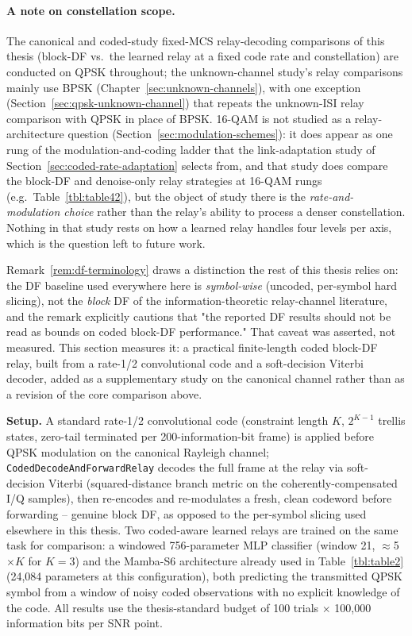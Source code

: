 \paragraph{A note on constellation scope.} The canonical and coded-study fixed-MCS relay-decoding comparisons of this thesis (block-DF vs.\ the learned relay at a fixed code rate and constellation) are conducted on QPSK throughout; the unknown-channel study's relay comparisons mainly use BPSK (Chapter~\ref{sec:unknown-channels}), with one exception (Section~\ref{sec:qpsk-unknown-channel}) that repeats the unknown-ISI relay comparison with QPSK in place of BPSK. 16-QAM is not studied as a relay-architecture question (Section~\ref{sec:modulation-schemes}): it does appear as one rung of the modulation-and-coding ladder that the link-adaptation study of Section~\ref{sec:coded-rate-adaptation} selects from, and that study does compare the block-DF and denoise-only relay strategies at 16-QAM rungs (e.g.\ Table~\ref{tbl:table42}), but the object of study there is the \emph{rate-and-modulation choice} rather than the relay's ability to process a denser constellation. Nothing in that study rests on how a learned relay handles four levels per axis, which is the question left to future work.

Remark~\ref{rem:df-terminology} draws a distinction the rest of this thesis relies on: the DF baseline used everywhere here is \emph{symbol-wise} (uncoded, per-symbol hard slicing), not the \emph{block} DF of the information-theoretic relay-channel literature, and the remark explicitly cautions that "the reported DF results should not be read as bounds on coded block-DF performance." That caveat was asserted, not measured. This section measures it: a practical finite-length coded block-DF relay, built from a rate-1/2 convolutional code and a soft-decision Viterbi decoder, added as a supplementary study on the canonical channel rather than as a revision of the core comparison above.

\textbf{Setup.} A standard rate-1/2 convolutional code (constraint length $K$, $2^{K-1}$ trellis states, zero-tail terminated per 200-information-bit frame) is applied before QPSK modulation on the canonical Rayleigh channel; \texttt{CodedDecodeAndForwardRelay} decodes the full frame at the relay via soft-decision Viterbi (squared-distance branch metric on the coherently-compensated I/Q samples), then re-encodes and re-modulates a fresh, clean codeword before forwarding -- genuine block DF, as opposed to the per-symbol slicing used elsewhere in this thesis. Two coded-aware learned relays are trained on the same task for comparison: a windowed 756-parameter MLP classifier (window 21, $\approx$5$\times K$ for $K=3$) and the Mamba-S6 architecture already used in Table~\ref{tbl:table2} (24,084 parameters at this configuration), both predicting the transmitted QPSK symbol from a window of noisy coded observations with no explicit knowledge of the code. All results use the thesis-standard budget of 100 trials $\times$ 100,000 information bits per SNR point.

